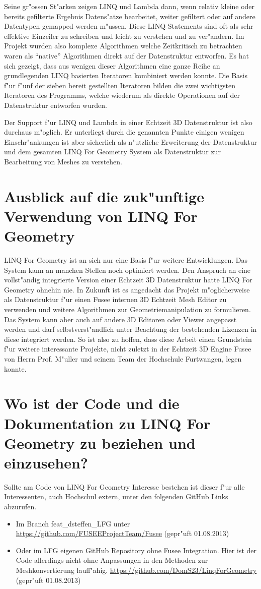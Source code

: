 \documentclass[pagesize, paper=a4, fontsize=12pt,titlepage=true, headings=small, headnosepline, abstractoff, liststotoc, nochapterprefix, plainheadsepline]{scrreprt}
\newcommand{\LFG}{LINQ For Geometry}
\newcommand{\LFGS}{LINQ For Geometry }
\begin{document}
Seine gr"ossen St"arken zeigen LINQ und Lambda dann, wenn relativ kleine oder bereits gefilterte Ergebnis Datens"atze bearbeitet, weiter gefiltert oder auf andere Datentypen gemapped werden m"ussen. Diese LINQ Statements sind oft als sehr effektive Einzeiler zu schreiben und leicht zu verstehen und zu ver"andern. Im Projekt wurden also komplexe Algorithmen welche Zeitkritisch zu betrachten waren als "`native"' Algorithmen direkt auf der Datenstruktur entworfen. Es hat sich gezeigt, dass aus wenigen dieser Algorithmen eine ganze Reihe an grundlegenden LINQ basierten Iteratoren kombiniert werden konnte. Die Basis f"ur f"unf der sieben bereit gestellten Iteratoren bilden die zwei wichtigsten Iteratoren des Programms, welche wiederum als direkte Operationen auf der Datenstruktur entworfen wurden.


Der Support f"ur LINQ und Lambda in einer Echtzeit 3D Datenstruktur ist also durchaus m"oglich. Er unterliegt durch die genannten Punkte einigen wenigen Einschr"ankungen ist aber sicherlich als n"utzliche Erweiterung der Datenstruktur und dem gesamten \LFGS System als Datenstruktur zur Bearbeitung von Meshes zu verstehen.
\section{Ausblick auf die zuk"unftige Verwendung von \LFG}
\LFGS ist an sich nur eine Basis f"ur weitere Entwicklungen. Das System kann an manchen Stellen noch optimiert werden. Den Anspruch an eine vollst"andig integrierte Version einer Echtzeit 3D Datenstruktur hatte \LFGS ohnehin nie. In Zukunft ist es angedacht das Projekt m"oglicherweise als Datenstruktur f"ur einen Fusee internen 3D Echtzeit Mesh Editor zu verwenden und weitere Algorithmen zur Geometriemanipulation zu formulieren. Das System kann aber auch auf andere 3D Editoren oder Viewer angepasst werden und darf selbstverst"andlich unter Beachtung der bestehenden Lizenzen in diese integriert werden. So ist also zu hoffen, dass diese Arbeit einen Grundstein f"ur weitere interessante Projekte, nicht zuletzt in der Echtzeit 3D Engine Fusee von Herrn Prof. M"uller und seinem Team der Hochschule Furtwangen, legen konnte.

\newpage
\section {Wo ist der Code und die Dokumentation zu \LFGS zu beziehen und einzusehen?}
	Sollte am Code von \LFGS Interesse bestehen ist dieser f"ur alle Interessenten, auch Hochschul extern, unter den folgenden GitHub Links abzurufen.
\begin{itemize}
\item Im Branch feat\_dsteffen\_LFG unter \url{https://github.com/FUSEEProjectTeam/Fusee} (gepr"uft 01.08.2013)
\item Oder im LFG eigenen GitHub Repository ohne Fusee Integration. Hier ist der Code allerdings nicht ohne Anpassungen in den Methoden zur Meshkonvertierung lauff"ahig. \url{https://github.com/DomS23/LinqForGeometry} (gepr"uft 01.08.2013)
\end{itemize}
\end{document}
